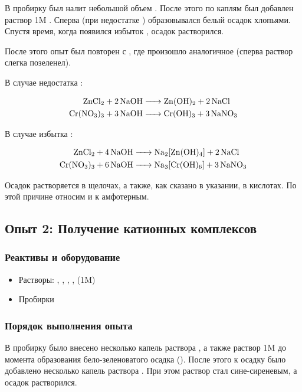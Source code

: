 \documentclass[a4paper, 12pt]{article}
\begin{document}
В пробирку был налит небольшой объем . После этого по каплям был добавлен раствор 1M . Сперва (при недостатке ) образовывался белый осадок хлопьями. Спустя время, когда появился избыток , осадок растворился.

После этого опыт был повторен с , где произошло аналогичное (сперва раствор слегка позеленел).

В случае недостатка :

\begin{align}
	\ce{ZnCl2 + 2NaOH &-> Zn(OH)2 + 2 NaCl}\\
	\ce{Cr(NO3)3 + 3 NaOH &-> Cr(OH)3 + 3NaNO3}
\end{align}

В случае избытка :

\begin{align}
	\ce{ZnCl2 + 4NaOH &-> Na2[Zn(OH)4] + 2NaCl}\\
	\ce{Cr(NO3)3 + 6 NaOH &-> Na3[Cr(OH)6] + 3NaNO3}
\end{align}

Осадок растворяется в щелочах, а также, как сказано в указании, в кислотах. По этой причине относим  и  к амфотерным.



\subsection{Опыт 2: Получение катионных комплексов}

\subsubsection{Реактивы и оборудование}

\begin{itemize}
	\item Растворы: , , , ,  (1M)
	
	\item Пробирки
\end{itemize}

\subsubsection{Порядок выполнения опыта}

В пробирку было внесено несколько капель раствора , а также раствор 1M  до момента образования бело-зеленоватого осадка (). После этого к осадку было добавлено несколько капель раствора . При этом раствор стал сине-сиреневым, а осадок растворился.
\end{document}
